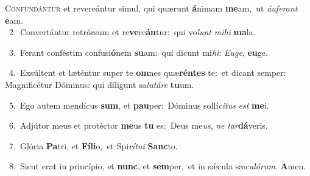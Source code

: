 \lettrine{\initial\textcolor{\initialcolor}{C}}{onfundántur} et revereántur simul, qui quærunt \textbf{á}\-nimam \textbf{me}\-am,~\star ut \textit{áu}\-\textit{fe}\textit{rant} \textbf{e}\-am.\\
{\numbfont\textcolor{\numbcolor}{~2.}}~Convertántur retrórsum et re\-\textbf{ve}\-re\-\textbf{án}\-tur:~\star qui vo\textit{lunt} \textit{mi}\-\textit{hi} \textbf{ma}\-la.\par
{\numbfont\textcolor{\numbcolor}{~3.}}~Ferant conféstim confusi\-\textbf{ó}\-nem \textbf{su}\-am:~\star qui dicunt mi\-\textit{hi}\-: \textit{Eu}\-\textit{ge}, \textbf{eu}\-ge.\par
{\numbfont\textcolor{\numbcolor}{~4.}}~Exsúltent et læténtur super te \textbf{om}\-nes quæ\-\textbf{rén}\-\textbf{tes} te:~\star et dicant semper: Magnificétur Dóminus: qui díligunt sa\-\textit{lu}\-\textit{tá}\textit{re} \textbf{tu}\-um.\par
{\numbfont\textcolor{\numbcolor}{~5.}}~Ego autem mendícus \textbf{sum}\-, et \textbf{pau}\-per:~\star Dóminus sollí\-\textit{ci}\-\textit{tus} \textit{est} \textbf{me}\-i.\par
{\numbfont\textcolor{\numbcolor}{~6.}}~Adjútor meus et protéctor \textbf{me}\-us \textbf{tu} es:~\star Deus me\-\textit{us}\-, \textit{ne} \textit{tar}\-\textbf{dá}veris.\par
{\numbfont\textcolor{\numbcolor}{~7.}}~Glória \textbf{Pa}\-tri, et \textbf{Fí}\-\textbf{li}o,~\star et Spi\-\textit{rí}\-\textit{tu}\textit{i} \textbf{Sanc}\-to.\par
{\numbfont\textcolor{\numbcolor}{~8.}}~Sicut erat in princípio, et \textbf{nunc}\-, et \textbf{sem}\-per,~\star et in sǽcula sæ\-\textit{cu}\-\textit{ló}\textit{rum}. \textbf{A}\-men.\par
